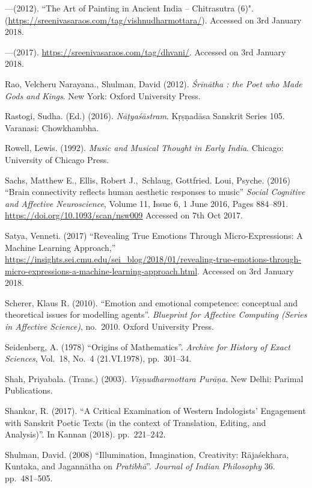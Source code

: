 \begin{thebibliography}{99}
---\kern3pt(2012). ``The Art of Painting in Ancient India -- Chitrasutra (6)". (\url{https://sreenivasaraos.com/tag/vishnudharmottara/}). Accessed on 3rd January 2018.

---\kern3pt(2017). \url{https://sreenivasaraos.com/tag/dhvani/}. Accessed on 3rd January 2018.

Rao, Velcheru Narayana., Shulman, David (2012). \textsl{Śrīnātha : the Poet who Made Gods and Kings}. New York: Oxford University Press.

Rastogi, Sudha. (Ed.) (2016). \textsl{Nāṭyaśāstram}. Kṛṣṇadāsa Sanskrit Series 105. Varanasi: Chowkhambha.

Rowell, Lewis. (1992). \textsl{Music and Musical Thought in Early India}. Chicago: University of Chicago Press.

Sachs, Matthew E., Ellis, Robert J., Schlaug, Gottfried. Loui, Psyche. (2016) “Brain connectivity reflects human aesthetic responses to music” \textsl{Social Cognitive and Affective Neuroscience}, Volume 11, Issue 6, 1 June 2016, Pages 884--891. \url{https://doi.org/10.1093/scan/nsw009} Accessed on 7th Oct 2017.

Satya, Venneti. (2017) “Revealing True Emotions Through Micro-Expressions: A Machine Learning Approach,” \url{https://insights.sei.cmu.edu/sei_blog/2018/01/revealing-true-emotions-through-micro-expressions-a-machine-learning-approach.html}. Accessed on 3rd January 2018.

Scherer, Klaus R. (2010). “Emotion and emotional competence: conceptual and theoretical issues for modelling agents”. \textsl{Blueprint for Affective Computing (Series in Affective Science)}, no.~2010. Oxford University Press.

Seidenberg, A. (1978) “Origins of Mathematics”. \textsl{Archive for History of Exact Sciences}, Vol.~18, No.~4 (21.VI.1978), pp.~301--34.

Shah, Priyabala. (Trans.) (2003). \textsl{Viṣṇudharmottara Purāṇa}. New Delhi: Parimal Publications.

Shankar, R. (2017). “A Critical Examination of Western Indologists’ Engagement with Sanskrit Poetic Texts (in the context of Translation, Editing, and Analysis)”. In Kannan (2018). pp.~221--242.

Shulman, David. (2008) “Illumination, Imagination, Creativity: Rājaśekhara, Kuntaka, and Jagannātha on \textsl{Pratibhā}”.  \textsl{Journal of Indian Philosophy} 36. pp.~481--505.


\end{thebibliography}
